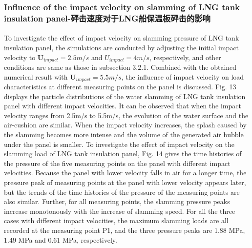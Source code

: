 \documentclass[UTF8]{ctexart}
\begin{document}
\subsubsection{Influence of the impact velocity on slamming of LNG tank insulation panel-砰击速度对于LNG船保温板砰击的影响}
\paragraph{\quad}To investigate the effect of impact velocity on slamming pressure of LNG tank insulation panel, the 
                simulations are conducted by adjusting the initial impact velocity to $\mathbf{U}_{impact} = 2.5m/s$ and 
                $U_{impact} = 4m/s$, respectively, and other conditions are same as those in subsection 3.2.1. 
                Combined with the obtained numerical result with $\mathbf{U}_{impact} = 5.5m/s$, the influence of impact 
                velocity on load characteristics at different measuring points on the panel is discussed. 
                Fig. 13 displays the particle distributions of the water slamming of LNG tank insulation 
                panel with different impact velocities. It can be observed that when the impact velocity 
                ranges from 2.5m/s to 5.5m/s, the evolution of the water surface and the air-cushion are similar. 
                When the impact velocity increases, the splash caused by the slamming becomes more intense and the 
                volume of the generated air bubble under the panel is smaller. To investigate the effect of impact 
                velocity on the slamming load of LNG tank insulation panel, Fig. 14 gives the time histories of the 
                pressure of the five measuring points on the panel with different impact velocities. Because the panel 
                with lower velocity falls in air for a longer time, the pressure peak of measuring points at the panel 
                with lower velocity appears later, but the trends of the time histories of the pressure of the measuring 
                points are also similar. Further, for all measuring points, the slamming pressure peaks increase 
                monotonously with the increase of slamming speed. For all the three cases with different impact 
                velocities, the maximum slamming loads are all recorded at the measuring point P1, and the three 
                pressure peaks are 1.88 MPa, 1.49 MPa and 0.61 MPa, respectively.
\end{document}
